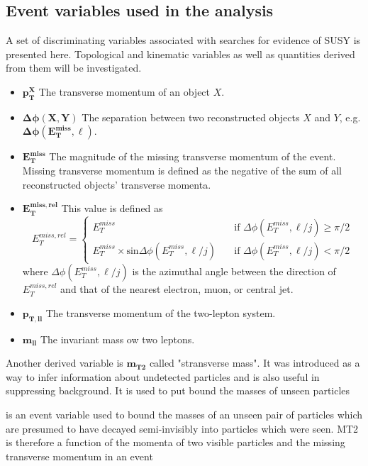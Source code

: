 \subsection{Event variables used in the analysis}
\label{subsec:Variables}

A set of discriminating variables associated with searches for evidence of SUSY is presented here. Topological and kinematic variables as well as quantities derived from them will be investigated.

\begin{itemize}[leftmargin=0cm]
\item[]$\bm{p^X_T}$ The transverse momentum of an object $X$.
\item[]$\bm{\Delta\phi(X,Y)}$ The separation between two reconstructed objects $X$ and $Y$, e.g. $\bm{\Delta\phi(E_T^{miss},\ell)}$.
\item[]$\bm{E^{miss}_{T}}$ The magnitude of the missing transverse momentum of the event. Missing transverse momentum is defined as the negative of the sum of all reconstructed objects' transverse momenta.
\item[]$\bm{E^{miss,rel}_T}$ This value is defined as 
\[
 E_T^{miss,rel} = 
  \begin{cases} 
   E_T ^{miss}\quad & \text{if } \Delta\phi(E_T^{miss},\ell/j) \geq \pi/2 \\
   E^{miss}_T\times \text{sin}\Delta\phi(E^{miss}_T,\ell/j) \quad      & \text{if } \Delta\phi(E^{miss}_T,\ell/j)<\pi/2
  \end{cases}
\]
\hspace{1cm} where $\Delta\phi(E_T^{miss},\ell/j)$ is the azimuthal angle between the direction of $E_T^{miss,rel}$ 
\hspace{1cm} and that of the nearest electron, muon, or central jet. 
\item[]$\bm{p_{T,ll}}$ The transverse momentum of the two-lepton system. 
\item[]$\bm{m_{ll}}$ The invariant mass ow two leptons.
\end{itemize}

Another derived variable is $\bm{m_{T2}}$ called "stransverse mass". It was introduced as a way to infer information about undetected particles and is also useful in suppressing background. It is used to put bound the masses of unseen particles

is an event variable used to bound the masses of an unseen pair of particles which are presumed to have decayed semi-invisibly into particles which were seen. MT2 is therefore a function of the momenta of two visible particles and the missing transverse momentum in an event


